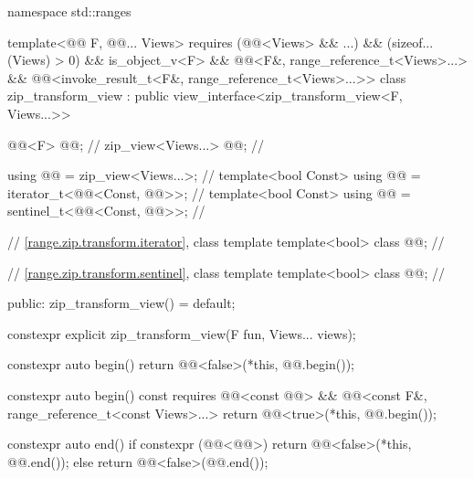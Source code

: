 %
%
%
\begin{codeblock}
namespace std::ranges {
  template<@@ F, @@... Views>
    requires (@@<Views> && ...) && (sizeof...(Views) > 0) && is_object_v<F> &&
              @@<F&, range_reference_t<Views>...> &&
              @@<invoke_result_t<F&, range_reference_t<Views>...>>
  class zip_transform_view : public view_interface<zip_transform_view<F, Views...>> {
    @@<F> @@;                    // \expos
    zip_view<Views...> @@;                // \expos

    using @@ = zip_view<Views...>;   // \expos
    template<bool Const>
      using @@ = iterator_t<@@<Const, @@>>;      // \expos
    template<bool Const>
      using @@ = sentinel_t<@@<Const, @@>>;       // \expos

    // \ref{range.zip.transform.iterator}, class template 
    template<bool> class @@;          // \expos

    // \ref{range.zip.transform.sentinel}, class template 
    template<bool> class @@;          // \expos

  public:
    zip_transform_view() = default;

    constexpr explicit zip_transform_view(F fun, Views... views);

    constexpr auto begin() { return @@<false>(*this, @@.begin()); }

    constexpr auto begin() const
      requires @@<const @@> &&
               @@<const F&, range_reference_t<const Views>...> {
      return @@<true>(*this, @@.begin());
    }

    constexpr auto end() {
      if constexpr (@@<@@>) {
        return @@<false>(*this, @@.end());
      } else {
        return @@<false>(@@.end());
      }
    }

}}
\end{codeblock}
